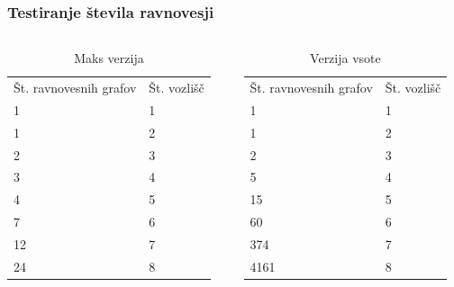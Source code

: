 \documentclass[12pt, hyperref={unicode}]{beamer}
\begin{document}
\begin{frame}

  \frametitle{Testiranje števila ravnovesji}
  \begin{columns}
    \begin{table}
    \scriptsize
    \begin{tabular}{ll}
        Št. ravnovesnih grafov & Št. vozlišč\\
        1                      & 1          \\
        1                      & 2          \\
        2                      & 3          \\
        3                      & 4          \\
        4                      & 5          \\
        7                      & 6          \\
        12                     & 7          \\
        24                     & 8          
    \end{tabular}
    \caption{Maks verzija}
    \end{table}
    \begin{table}
    \scriptsize
    \begin{tabular}{ll}
      Št. ravnovesnih grafov & Št. vozlišč\\
      1                      & 1          \\
      1                      & 2          \\
      2                      & 3          \\
      5                      & 4          \\
      15                     & 5          \\
      60                     & 6          \\
      374                    & 7          \\
      4161                   & 8         
    \end{tabular}
    \caption{Verzija vsote}
    \end{table}
\end{columns}


\end{frame}
\end{document}
